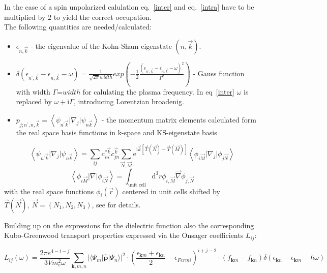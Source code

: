 In the case of a spin unpolarized calulation eq.~\ref{inter} and eq.~\ref{intra} have to be multiplied by $2$ to yield the correct occupation.\\
The following quantities are needed/calculated:
\begin{itemize}
 \item[-] $\epsilon_{n,\vec{k}}$ - the eigenvalue of the Kohn-Sham eigenstate $(n,\vec{k})$.
 \item[-] $\delta(\epsilon_{n^{'},\vec{k}}-\epsilon_{n,\vec{k}}-\omega)=\frac{1}{\sqrt{2\pi}width}exp\left(-\frac{1}{2}\frac{(\epsilon_{n^{'},\vec{k}}-\epsilon_{n,\vec{k}}-\omega)^2}{\Gamma^2}\right)$ - Gauss function with width $\Gamma$=$width$ for calulating the plasma frequency. In eq~\ref{inter} $\omega$ is replaced by $\omega+\mathrm{i}\Gamma$, introducing Lorentzian broadenig.
 \item[-] $p_{j;n^{'},n,\vec{k}}=\left\langle\psi_{n^{'}\vec{k}}\vert\nabla_j\vert\psi_{n\vec{k}}\right\rangle$ - the momentum matrix elements calculated form the real space basis 
functions in k-space and KS-eigenstate basis
\end{itemize}
\begin{equation}
 \left\langle\psi_{n^{'}\vec{k}}\vert\nabla_j\vert\psi_{n\vec{k}}\right\rangle=\sum_{ij}c_{in^{'}}^{*\vec{k}}c_{jn}^{\vec{k}}\sum_{\vec{N},\vec{M}}\mathrm{e}^{\mathrm{i}\vec{k}\left[\vec{T}\left(\vec{N}\right)-\vec{T}\left(\vec{M}\right)\right]}\left\langle\phi_{i\vec{M}}\vert\nabla_j\vert\phi_{j\vec{N}}\right\rangle
\end{equation}
\begin{equation}
 \left\langle\phi_{i\vec{M}}\vert\nabla\vert\phi_{i\vec{N}}\right\rangle=\int_{\text{unit cell}}\mathrm{d}^3 r \phi_{i,\vec{M}}\vec{\nabla}\phi_{j,\vec{N}}
\end{equation}
with the real space functions $\phi_i(\vec{r})$ centered in unit cells shifted by $\vec{T}\left(\vec{N}\right),~\vec{N}=(N_1, N_2, N_3)$, see \cite{Blum08} for details.

Building up on the expressions for the dielectric function also the corresponding Kubo-Greenwood transport properties expressed via the Onsager coefficients $L_{ij}$: 

\begin{equation}
 L_{ij}(\omega) = \frac{2\pi e^{4-i-j}}{3V m^2_e \omega} \sum_{\bm{k},m,n} | \langle \Psi_m |\bm{\hat{p}} | \Psi_n \rangle|^2 \cdot   \left( \frac{\epsilon_{\bm{k}m} + \epsilon_{\bm{k}n}}{2} -\epsilon_{Fermi}   \right)^{i+j-2}   \cdot   \left(f_{\bm{k}m}-f_{\bm{k}n}\right)  \delta\left(\epsilon_{\bm{k}n}-\epsilon_{\bm{k}m}-\hbar \omega \right) 
\end{equation}

